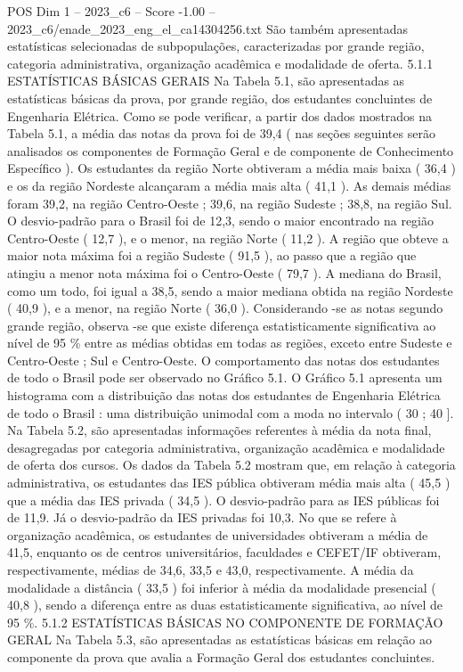 \begin{textsample}{POS Dim 1 – 2023\_c6 – Score -1.00 – 2023\_c6/enade\_2023\_eng\_el\_ca14304256.txt}
São também apresentadas estatísticas selecionadas de subpopulações, caracterizadas por grande região, categoria administrativa, organização acadêmica e modalidade de oferta. 5.1.1 ESTATÍSTICAS BÁSICAS GERAIS Na Tabela 5.1, são apresentadas as estatísticas básicas da prova, por grande região, dos estudantes concluintes de Engenharia Elétrica.
Como se pode verificar, a partir dos dados mostrados na Tabela 5.1, a média das notas da prova foi de 39,4 ( nas seções seguintes serão analisados os componentes de Formação Geral e de componente de Conhecimento Específico ).
Os estudantes da região Norte obtiveram a média mais baixa ( 36,4 ) e os da região Nordeste alcançaram a média mais alta ( 41,1 ).
As demais médias foram 39,2, na região Centro-Oeste ; 39,6, na região Sudeste ; 38,8, na região Sul.
O desvio-padrão para o Brasil foi de 12,3, sendo o maior encontrado na região Centro-Oeste ( 12,7 ), e o menor, na região Norte ( 11,2 ).
A região que obteve a maior nota máxima foi a região Sudeste ( 91,5 ), ao passo que a região que atingiu a menor nota máxima foi o Centro-Oeste ( 79,7 ).
A mediana do Brasil, como um todo, foi igual a 38,5, sendo a maior mediana obtida na região Nordeste ( 40,9 ), e a menor, na região Norte ( 36,0 ).
Considerando -se as notas segundo grande região, observa -se que existe diferença estatisticamente significativa ao nível de 95 \% entre as médias obtidas em todas as regiões, exceto entre Sudeste e Centro-Oeste ; Sul e Centro-Oeste.
O comportamento das notas dos estudantes de todo o Brasil pode ser observado no Gráfico 5.1.
O Gráfico 5.1 apresenta um histograma com a distribuição das notas dos estudantes de Engenharia Elétrica de todo o Brasil : uma distribuição unimodal com a moda no intervalo ( 30 ; 40 ].
Na Tabela 5.2, são apresentadas informações referentes à média da nota final, desagregadas por categoria administrativa, organização acadêmica e modalidade de oferta dos cursos.
Os dados da Tabela 5.2 mostram que, em relação à categoria administrativa, os estudantes das IES pública obtiveram média mais alta ( 45,5 ) que a média das IES privada ( 34,5 ).
O desvio-padrão para as IES públicas foi de 11,9.
Já o desvio-padrão da IES privadas foi 10,3.
No que se refere à organização acadêmica, os estudantes de universidades obtiveram a média de 41,5, enquanto os de centros universitários, faculdades e CEFET/IF obtiveram, respectivamente, médias de 34,6, 33,5 e 43,0, respectivamente.
A média da modalidade a distância ( 33,5 ) foi inferior à média da modalidade presencial ( 40,8 ), sendo a diferença entre as duas estatisticamente significativa, ao nível de 95 \%. 5.1.2 ESTATÍSTICAS BÁSICAS NO COMPONENTE DE FORMAÇÃO GERAL Na Tabela 5.3, são apresentadas as estatísticas básicas em relação ao componente da prova que avalia a Formação Geral dos estudantes concluintes.

\end{textsample}
